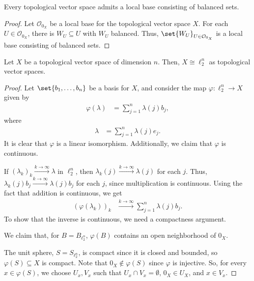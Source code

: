 \documentclass[10pt]{mypackage}
\begin{document}
\begin{proposition}
  Every topological vector space admits a local base consisting of balanced sets.
\end{proposition}
\begin{proof}
  Let $\mathcal{O}_{0_{X}}$ be a local base for the topological vector space $X$. For each $U\in \mathcal{O}_{0_X}$, there is $W_{U}\subseteq U$ with $W_{U}$ balanced. Thus, $\set{W_{U}}_{U\in \mathcal{O}_{0_X}}$ is a local base consisting of balanced sets.
\end{proof}
\begin{proposition}
  Let $X$ be a topological vector space of dimension $n$. Then, $X\cong \ell_{2}^{n}$ as topological vector spaces.
\end{proposition}
\begin{proof}
  Let $\set{b_1,\dots,b_n}$ be a basis for $X$, and consider the map $\varphi: \ell_{2}^{n}\rightarrow X$ given by
  \begin{align*}
    \varphi\left(\lambda\right) &= \sum_{j=1}^{n}\lambda\left(j\right)b_j,
  \end{align*}
  where
  \begin{align*}
    \lambda &= \sum_{j=1}^{n}\lambda(j)e_j.
  \end{align*}
  It is clear that $\varphi$ is a linear isomorphism. Additionally, we claim that $\varphi$ is continuous.\newline

  If $\left(\lambda_{k}\right)_{k}\xrightarrow{k\rightarrow\infty}\lambda$ in $\ell_{2}^{n}$, then $\lambda_{k}\left(j\right)\xrightarrow{k\rightarrow\infty}\lambda(j)$ for each $j$. Thus, $\lambda_{k}\left(j\right)b_j\xrightarrow{k\rightarrow\infty}\lambda(j)b_j$ for each $j$, since multiplication is continuous. Using the fact that addition is continuous, we get
  \begin{align*}
    \left(\varphi\left(\lambda_{k}\right)\right)_{k} &\xrightarrow{k\rightarrow\infty}\sum_{j=1}^{n}\lambda(j)b_j.
  \end{align*}
  To show that the inverse is continuous, we need a compactness argument.\newline

  We claim that, for $B = B_{\ell_{2}^{n}}$, $\varphi(B)$ contains an open neighborhood of $0_{X}$.\newline

  The unit sphere, $S = S_{\ell_{2}^{n}}$, is compact since it is closed and bounded, so $\varphi(S) \subseteq X$ is compact. Note that $0_{X}\notin \varphi(S)$ since $\varphi$ is injective. So, for every $x\in \varphi(S)$, we choose $U_{x},V_x$ such that $U_x\cap V_x = \emptyset$, $0_{X}\in U_X$, and $x\in V_x$.\newline


\end{proof}
\end{document}
